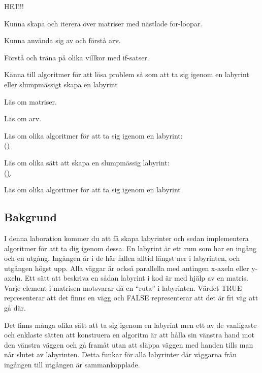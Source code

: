 

\Lab{\LabWeekNINE}

\begin{Goals}
\item HEJ!!!
\item Kunna skapa och iterera över matriser med nästlade for-loopar.
\item Kunna använda sig av och förstå arv.
\item Förstå och träna på olika villkor med if-satser.
\item Känna till algoritmer för att lösa problem så som att ta sig igenom en labyrint eller slumpmässigt skapa en labyrint
\end{Goals}

\begin{Preparations}
\item Läs om matriser.
\item Läs om arv.
\item Läs om olika algoritmer för att ta sig igenom en labyrint: \\
(\href{https://en.wikipedia.org/wiki/Maze\_solving\_algorithm})
\item Läs om olika sätt att skapa en slumpmässig labyrint: \\
(\href{https://en.wikipedia.org/wiki/Maze\_generation\_algorithm}).
\item Läs om olika algoritmer för att ta sig igenom en labyrint
\end{Preparations}

\subsection{Bakgrund}
I denna laboration kommer du att få skapa labyrinter och sedan implementera algoritmer för att ta dig igenom dessa. En labyrint är ett rum som har en ingång och en utgång. Ingången är i de här fallen alltid längst ner i labyrinten, och utgången högst upp. Alla väggar är också parallella med antingen x-axeln eller y-axeln. Ett sätt att beskriva en sådan labyrint i kod är med hjälp av en matris. Varje element i matrisen motsvarar då en ``ruta'' i labyrinten. Värdet TRUE representerar att det finns en vägg och FALSE representerar att det är fri väg att gå där.

Det finns många olika sätt att ta sig igenom en labyrint men ett av de vanligaste och enklaste sätten att konstruera en algoritm är att hålla sin vänstra hand mot den vänstra väggen och gå framåt utan att släppa väggen med handen tills man når slutet av labyrinten. Detta funkar för alla labyrinter där väggarna från ingången till utgången är sammankopplade.

